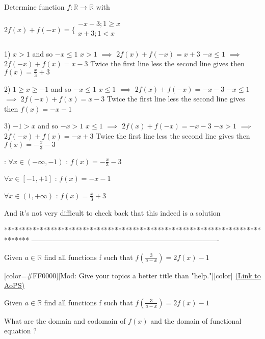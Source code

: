\begin{solution}
	\begin{tcolorbox}Determine function $f:\mathbb{R}\to\mathbb{R}$ with

$2f(x)+f(-x)= \{\begin{array}{l}-x-3; 1\ge x \\x+3; 1<x\\ \end{array}$\end{tcolorbox}
1) $x>1$ and so $-x\le 1$
$x>1$ $\implies$ $2f(x)+f(-x)=x+3$
$-x\le 1$ $\implies$ $2f(-x)+f(x)=x-3$
Twice the first line less the second line gives then $f(x)=\frac x3+3$

2) $1\ge x\ge -1$ and so $-x\le 1$
$x\le 1$ $\implies$ $2f(x)+f(-x)=-x-3$
$-x\le 1$ $\implies$ $2f(-x)+f(x)=x-3$
Twice the first line less the second line gives then $f(x)=-x-1$

3) $-1>x$ and so $-x>1$
$x\le 1$ $\implies$ $2f(x)+f(-x)=-x-3$
$-x> 1$ $\implies$ $2f(-x)+f(x)=-x+3$
Twice the first line less the second line gives then $f(x)=-\frac x3-3$

 :
$\forall x\in(-\infty,-1)$ : $f(x)=-\frac x3-3$

$\forall x\in[-1,+1]$ : $f(x)=-x-1$

$\forall x\in (1,+\infty)$ : $f(x)=\frac x3+3$

And it's not very difficult to check back that this indeed is a solution
\end{solution}
*******************************************************************************
-------------------------------------------------------------------------------

\begin{problem}
	Given $ a\in \mathbb{R}$ find all functions f such that $ f(\frac{3}{a-x})=2f(x)-1$

[color=#FF0000][Mod: Give your topics a better title than "help."][\/color]
	\flushright \href{https://artofproblemsolving.com/community/c6h476651}{(Link to AoPS)}
\end{problem}



\begin{solution}
	\begin{tcolorbox}Given $ a\in \mathbb{R}$ find all functions f such that $ f(\frac{3}{a-x})=2f(x)-1$\end{tcolorbox}
What are the domain and codomain of $f(x)$ and the domain of functional equation ?
\end{solution}



